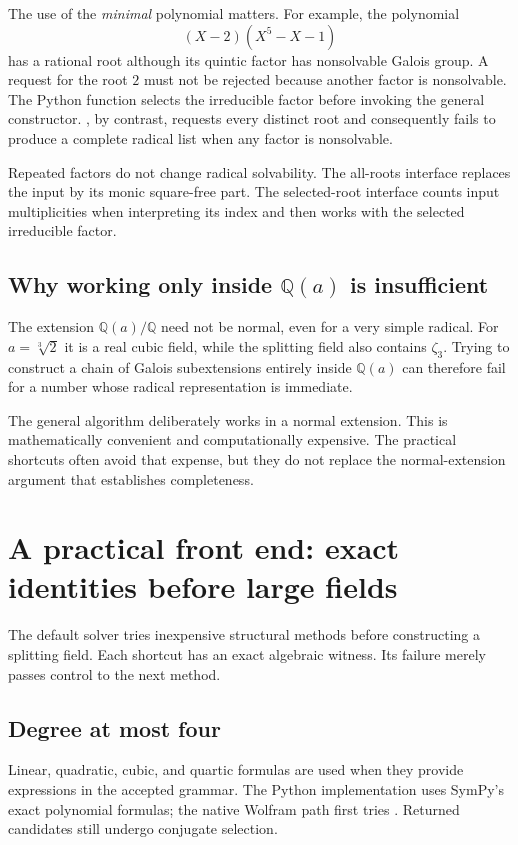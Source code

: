 \documentclass[11pt,a4paper]{article}
\newcommand{\Q}{\mathbb Q}
\newcommand{\code}[1]{\texttt{\detokenize{#1}}}
\theoremstyle{definition}
\theoremstyle{remark}
\begin{document}
The use of the \emph{minimal} polynomial matters. For example, the polynomial
\[
 (X-2)(X^5-X-1)
\]
has a rational root although its quintic factor has nonsolvable Galois group. A request for the root $2$ must not be rejected because another factor is nonsolvable. The Python \code{solve_root} function selects the irreducible factor before invoking the general constructor. \code{solve_polynomial}, by contrast, requests every distinct root and consequently fails to produce a complete radical list when any factor is nonsolvable.

Repeated factors do not change radical solvability. The all-roots interface replaces the input by its monic square-free part. The selected-root interface counts input multiplicities when interpreting its index and then works with the selected irreducible factor.

\subsection{Why working only inside \texorpdfstring{$\Q(a)$}{Q(a)} is insufficient}

The extension $\Q(a)/\Q$ need not be normal, even for a very simple radical. For $a=\sqrt[3]{2}$ it is a real cubic field, while the splitting field also contains $\zeta_3$. Trying to construct a chain of Galois subextensions entirely inside $\Q(a)$ can therefore fail for a number whose radical representation is immediate.

The general algorithm deliberately works in a normal extension. This is mathematically convenient and computationally expensive. The practical shortcuts often avoid that expense, but they do not replace the normal-extension argument that establishes completeness.

\section{A practical front end: exact identities before large fields}

The default solver tries inexpensive structural methods before constructing a splitting field. Each shortcut has an exact algebraic witness. Its failure merely passes control to the next method.

\subsection{Degree at most four}

Linear, quadratic, cubic, and quartic formulas are used when they provide expressions in the accepted grammar. The Python implementation uses SymPy's exact polynomial formulas; the native Wolfram path first tries \code{ToRadicals}. Returned candidates still undergo conjugate selection.
\end{document}
